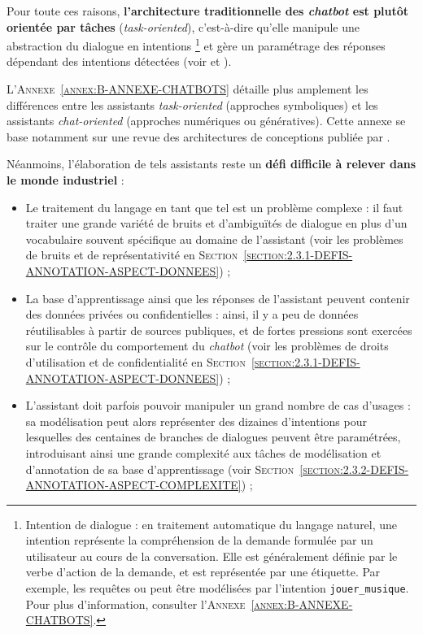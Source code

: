 	Pour toute ces raisons, \textbf{l'architecture traditionnelle des \textit{chatbot} est plutôt orientée par tâches} (\textit{task-oriented}), c'est-à-dire qu'elle manipule une abstraction du dialogue en intentions \footnote{
		Intention de dialogue : en traitement automatique du langage naturel, une intention représente la compréhension de la demande formulée par un utilisateur au cours de la conversation.
		Elle est généralement définie par le verbe d'action de la demande, et est représentée par une étiquette.
		Par exemple, les requêtes  ou  peut être modélisées par l'intention \texttt{jouer\_musique}.
		Pour plus d'information, consulter l'\textsc{Annexe~\ref{annex:B-ANNEXE-CHATBOTS}}.
	} et gère un paramétrage des réponses dépendant des intentions détectées (voir \cite{chen-etal:2017:survey-dialogue-systems} et \cite{brabra-etal:2022:dialogue-management-conversational}).
	
	\begin{leftBarInformation}
		L'\textsc{Annexe~\ref{annex:B-ANNEXE-CHATBOTS}} détaille plus amplement les différences entre les assistants \textit{task-oriented} (approches symboliques) et les assistants \textit{chat-oriented} (approches numériques ou génératives).
		Cette annexe se base notamment sur une revue des architectures de conceptions publiée par \cite{chen-etal:2017:survey-dialogue-systems}.
	\end{leftBarInformation}
	
	
	Néanmoins, l'élaboration de tels assistants reste un \textbf{défi difficile à relever dans le monde industriel} :
	\begin{itemize}
		\item Le traitement du langage en tant que tel est un problème complexe : il faut traiter une grande variété de bruits et d'ambiguïtés de dialogue en plus d'un vocabulaire souvent spécifique au domaine de l'assistant (voir les problèmes de bruits et de représentativité en \textsc{Section~\ref{section:2.3.1-DEFIS-ANNOTATION-ASPECT-DONNEES}}) ;
		\item La base d'apprentissage ainsi que les réponses de l'assistant peuvent contenir des données privées ou confidentielles : ainsi, il y a peu de données réutilisables à partir de sources publiques, et de fortes pressions sont exercées sur le contrôle du comportement du \textit{chatbot} (voir les problèmes de droits d'utilisation et de confidentialité en \textsc{Section~\ref{section:2.3.1-DEFIS-ANNOTATION-ASPECT-DONNEES}}) ;
		\item L'assistant doit parfois pouvoir manipuler un grand nombre de cas d'usages : sa modélisation peut alors représenter des dizaines d'intentions pour lesquelles des centaines de branches de dialogues peuvent être paramétrées, introduisant ainsi une grande complexité aux tâches de modélisation et d'annotation de sa base d'apprentissage (voir \textsc{Section~\ref{section:2.3.2-DEFIS-ANNOTATION-ASPECT-COMPLEXITE}}) ;
	\end{itemize}
	
